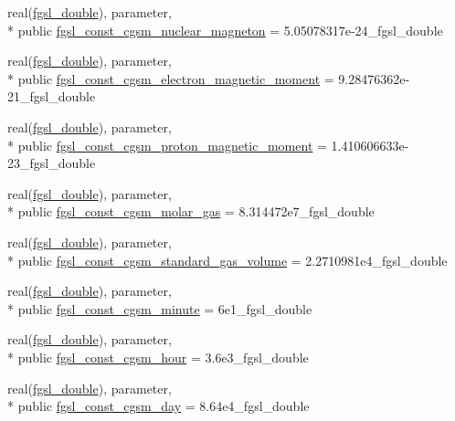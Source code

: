 \begin{DoxyCompactItemize}
\item 
real(\hyperlink{classfgsl_a9af5113378e0f000eb479d3f90196ddf}{fgsl\-\_\-double}), parameter, \\*
public \hyperlink{classfgsl_a31fef82c84b5351ce89d573f6be1eb8f}{fgsl\-\_\-const\-\_\-cgsm\-\_\-nuclear\-\_\-magneton} = 5.\-05078317e-\/24\-\_\-fgsl\-\_\-double
\item 
real(\hyperlink{classfgsl_a9af5113378e0f000eb479d3f90196ddf}{fgsl\-\_\-double}), parameter, \\*
public \hyperlink{classfgsl_aeef2a928302f3601b87ba01c486de9bd}{fgsl\-\_\-const\-\_\-cgsm\-\_\-electron\-\_\-magnetic\-\_\-moment} = 9.\-28476362e-\/21\-\_\-fgsl\-\_\-double
\item 
real(\hyperlink{classfgsl_a9af5113378e0f000eb479d3f90196ddf}{fgsl\-\_\-double}), parameter, \\*
public \hyperlink{classfgsl_a91a53064c6d7b4c8af4bf3368a896d74}{fgsl\-\_\-const\-\_\-cgsm\-\_\-proton\-\_\-magnetic\-\_\-moment} = 1.\-410606633e-\/23\-\_\-fgsl\-\_\-double
\item 
real(\hyperlink{classfgsl_a9af5113378e0f000eb479d3f90196ddf}{fgsl\-\_\-double}), parameter, \\*
public \hyperlink{classfgsl_a23addc2e9852914913cdbe8e164b27ae}{fgsl\-\_\-const\-\_\-cgsm\-\_\-molar\-\_\-gas} = 8.\-314472e7\-\_\-fgsl\-\_\-double
\item 
real(\hyperlink{classfgsl_a9af5113378e0f000eb479d3f90196ddf}{fgsl\-\_\-double}), parameter, \\*
public \hyperlink{classfgsl_ab7cd57aadb050c6aa836b7ab1246f435}{fgsl\-\_\-const\-\_\-cgsm\-\_\-standard\-\_\-gas\-\_\-volume} = 2.\-2710981e4\-\_\-fgsl\-\_\-double
\item 
real(\hyperlink{classfgsl_a9af5113378e0f000eb479d3f90196ddf}{fgsl\-\_\-double}), parameter, \\*
public \hyperlink{classfgsl_ab028fa17e53d65adbb35fa580f5e25a0}{fgsl\-\_\-const\-\_\-cgsm\-\_\-minute} = 6e1\-\_\-fgsl\-\_\-double
\item 
real(\hyperlink{classfgsl_a9af5113378e0f000eb479d3f90196ddf}{fgsl\-\_\-double}), parameter, \\*
public \hyperlink{classfgsl_ae4bb30ae02c03177a710c656125616a7}{fgsl\-\_\-const\-\_\-cgsm\-\_\-hour} = 3.\-6e3\-\_\-fgsl\-\_\-double
\item 
real(\hyperlink{classfgsl_a9af5113378e0f000eb479d3f90196ddf}{fgsl\-\_\-double}), parameter, \\*
public \hyperlink{classfgsl_af34712504add6a207ec8e068ff61d8cd}{fgsl\-\_\-const\-\_\-cgsm\-\_\-day} = 8.\-64e4\-\_\-fgsl\-\_\-double

\end{DoxyCompactItemize}
